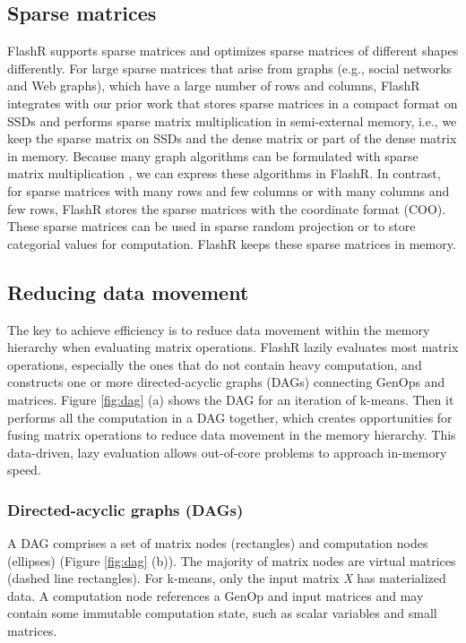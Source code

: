 \subsection{Sparse matrices}
FlashR supports sparse matrices and optimizes sparse matrices of different
shapes differently.
For large sparse matrices that arise from graphs (e.g., social networks
and Web graphs), which have a large number of rows and columns, FlashR integrates
with our prior work \cite{SEM_SpMM} that stores sparse matrices
in a compact format on SSDs and performs sparse matrix multiplication
in semi-external memory, i.e., we keep the sparse matrix on SSDs and
the dense matrix or part of the dense matrix in memory.
Because many graph algorithms can be formulated with sparse matrix multiplication
\cite{linear_algebra}, we can express these algorithms in FlashR. In contrast,
for sparse matrices with many rows and few columns or with many columns
and few rows, FlashR stores the sparse matrices with the coordinate format
(COO). These sparse matrices can be used in sparse random projection
\cite{sparse_proj} or to store categorial values for computation.
FlashR keeps these sparse matrices in memory.

\subsection{Reducing data movement}\label{sec:datamove}
The key to achieve efficiency is to reduce data movement within the memory hierarchy
when evaluating matrix operations. FlashR lazily evaluates most matrix
operations, especially the ones that do not contain heavy computation,
and constructs one or more directed-acyclic graphs (DAGs) connecting GenOps and
matrices. Figure \ref{fig:dag} (a) shows the DAG for an iteration of k-means.
Then it performs all the computation in a DAG together, which creates opportunities
for fusing matrix operations to reduce data movement in the memory hierarchy.
This data-driven, lazy evaluation allows out-of-core problems 
to approach in-memory speed.

\subsubsection{Directed-acyclic graphs (DAGs)} \label{dag}
A DAG comprises a set of matrix nodes (rectangles) and computation nodes
(ellipses) (Figure \ref{fig:dag} (b)). The majority of matrix nodes are
virtual matrices (dashed line rectangles).
For k-means, only the input matrix \textit{X} has materialized data.
A computation node references a GenOp and input matrices and
may contain some immutable computation state, such as scalar variables and
small matrices. 

